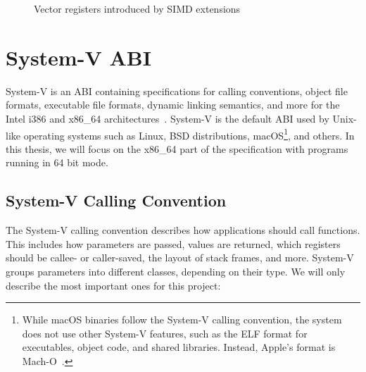 \begin{figure}[htpb]
{
    }
    \caption{Vector registers introduced by SIMD extensions}
    \label{fig:vector-regs}
\end{figure}


\section{System-V ABI}\label{sec:system-v-abi}

System-V is an \gls{ABI} containing specifications for calling conventions, object file formats, executable file formats, dynamic linking semantics, and more for the Intel i386 and x86\_64 architectures~\parencite{system-v_2021}.
System-V is the default \gls{ABI} used by Unix-like operating systems such as Linux, BSD distributions, macOS\footnote{While macOS binaries follow the System-V calling convention, the system does not use other System-V features, such as the ELF format for executables, object code, and shared libraries. Instead, Apple's format is Mach-O~\parencite{apple_x86-64_nodate}.}, and others.
In this thesis, we will focus on the x86\_64 part of the specification with programs running in 64 bit mode.

\subsection{System-V Calling Convention}\label{subsec:system-v-calling-convention}

The System-V calling convention describes how applications should call functions.
This includes how parameters are passed, values are returned, which registers should be callee- or caller-saved, the layout of stack frames, and more.
System-V groups parameters into different classes, depending on their type.
We will only describe the most important ones for this project:

